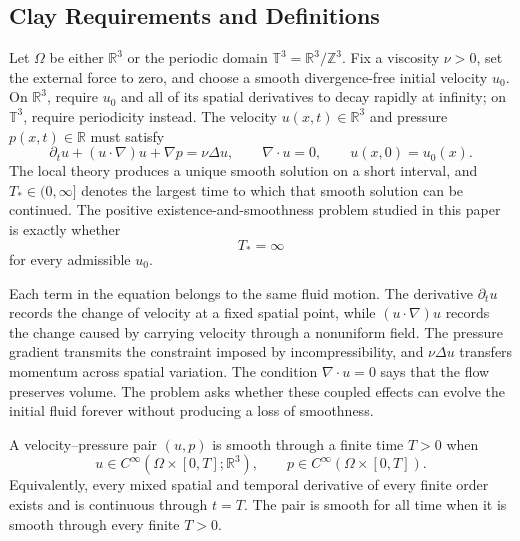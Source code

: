 \subsection{Clay Requirements and Definitions}\label{sub:ClayRequirements}

Let \(\Omega\) be either \(\mathbb R^3\) or the periodic domain \(\mathbb T^3=\mathbb R^3/\mathbb Z^3\).
Fix a viscosity \(\nu>0\), set the external force to zero, and choose a smooth divergence-free initial velocity \(u_0\).
On \(\mathbb R^3\), require \(u_0\) and all of its spatial derivatives to decay rapidly at infinity; on \(\mathbb T^3\), require periodicity instead.
The velocity \(u(x,t)\in\mathbb R^3\) and pressure \(p(x,t)\in\mathbb R\) must satisfy
\[
  \partial_tu+(u\cdot\nabla)u+\nabla p
  =
  \nu\Delta u,
  \qquad
  \nabla\cdot u=0,
  \qquad
  u(x,0)=u_0(x).
\]
The local theory produces a unique smooth solution on a short interval, and \(T_*\in(0,\infty]\) denotes the largest time to which that smooth solution can be continued.
The positive existence-and-smoothness problem studied in this paper is exactly whether
\[
  T_*=\infty
\]
for every admissible \(u_0\).

Each term in the equation belongs to the same fluid motion.
The derivative \(\partial_tu\) records the change of velocity at a fixed spatial point, while \((u\cdot\nabla)u\) records the change caused by carrying velocity through a nonuniform field.
The pressure gradient transmits the constraint imposed by incompressibility, and \(\nu\Delta u\) transfers momentum across spatial variation.
The condition \(\nabla\cdot u=0\) says that the flow preserves volume.
The problem asks whether these coupled effects can evolve the initial fluid forever without producing a loss of smoothness.


\begin{definition}[Smoothness]\label{def:Smoothness}
A velocity--pressure pair \((u,p)\) is smooth through a finite time \(T>0\) when
\[
  u\in C^\infty\!\left(\Omega\times[0,T];\mathbb R^3\right),
  \qquad
  p\in C^\infty\!\left(\Omega\times[0,T]\right).
\]
Equivalently, every mixed spatial and temporal derivative of every finite order exists and is continuous through \(t=T\).
The pair is smooth for all time when it is smooth through every finite \(T>0\).
\end{definition}

